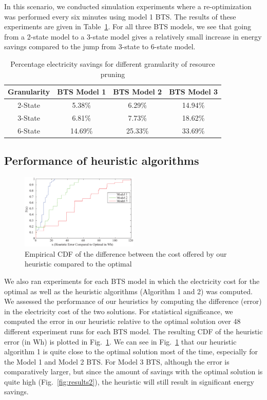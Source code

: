 In this scenario, we conducted simulation experiments where a re-optimization was performed every six minutes using model 1 BTS. The results of these experiments are given in Table~\ref{tab:granularityresults}. For all three BTS models, we see that going from a 2-state model to a 3-state model gives a relatively small increase in energy savings compared to the jump from 3-state to 6-state model.  

\begin{table}
\centering
\begin{tabular}{|c|c|c|c|}
\hline
Granularity & BTS Model 1 & BTS Model 2 & BTS Model 3\\
\hline 2-State & 5.38\% & 6.29\% &  14.94\% \\
\hline 3-State & 6.81\% & 7.73\% &  18.62\% \\
\hline 6-State & 14.69\% & 25.33\% &  33.69\% \\
\hline
\end{tabular}
\caption{Percentage electricity savings for different granularity of resource pruning}
\label{tab:granularityresults}
\end{table}

\subsection{Performance of heuristic algorithms}
\label{subsec:heur1-results}
\begin{figure}
\includegraphics[width=0.5\textwidth]{figures/heuristicerror-touchedup.eps}
\caption{Empirical CDF of the difference between the cost offered by our heuristic compared to the optimal}
\label{fig:results5}
\end{figure}

We also ran experiments for each BTS model in which the electricity cost for the optimal as well as the heuristic algorithms (Algorithm 1 and 2) was computed. We assessed the performance of our heuristics by computing the difference (error) in the electricity cost of the two solutions. For statistical significance, we computed the error in our heuristic relative to the optimal solution over 48 different experiment runs for each BTS model. The resulting CDF of the heuristic error (in Wh) is plotted in Fig.~\ref{fig:results5}. We can see in Fig.~\ref{fig:results5} that our heuristic algorithm 1 is quite close to the optimal solution most of the time, especially for the Model 1 and Model 2 BTS. For Model 3 BTS, although the error is comparatively larger, but since the amount of savings with the optimal solution is quite high (Fig.~\ref{fig:results2}), the heuristic will still result in significant energy savings.  

